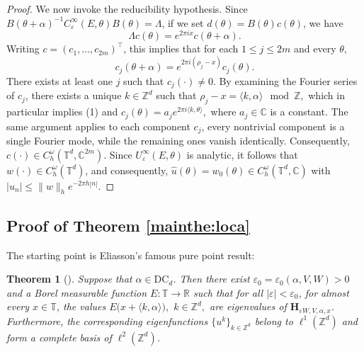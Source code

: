 \documentclass[reqno,11pt]{amsart}
\newtheorem{theorem}{Theorem}[section]
\begin{document}
\begin{proof}
We now invoke the reducibility hypothesis.
Since
$B(\theta+\alpha)^{-1}C_{\varepsilon}^{\infty}(E,\theta)B(\theta)=\Lambda$, if we  set $d(\theta) = B(\theta) c(\theta)$, we have
$$\Lambda  c(\theta)=e^{2\pi i x}  c(\theta+\alpha).$$
Writing $c=(c_1,\dots,c_{2m})^\top$, this implies that for each
$1\le j\le 2m$ and every $\theta$,
$$c_j(\theta+\alpha)=e^{2\pi i(\rho_j-x)}  c_j(\theta).
$$
 There exists at least one $j$ such that $c_j(\cdot)\neq0$.  By examining the Fourier series of $c_j$, there exists a unique $k \in \mathbb{Z}^d$ such that $
\rho_j - x = \langle k, \alpha \rangle \mod \mathbb{Z},
$ which in particular implies (1) and $
c_j(\theta) = a_j e^{2\pi i \langle k, \theta \rangle},
$ where $a_j \in \mathbb{C}$ is a constant. 
The same argument applies to each component $c_j$,
every nontrivial component is a single Fourier mode, while the remaining ones
vanish identically.
Consequently, $c(\cdot) \in C_h^\omega(\mathbb{T}^d, \mathbb{C}^{2m})$. Since $U_\varepsilon^{\infty}(E,\theta)$ is analytic, it follows that $w(\cdot) \in C_h^\omega(\mathbb{T}^d)$, and consequently, $\widehat{u}(\theta) =w_0(\theta)  \in C_h^\omega(\mathbb{T}^d, \mathbb{C})$ with $
|u_n| \leq \|w\|_h e^{-2\pi h |n |}.
$
\end{proof}












\subsection*{Proof of Theorem \ref{mainthe:loca}}
The starting point is Eliasson’s famous pure point result:
  \begin{theorem}[\cite{E}]\label{cor-Eliasson}
    Suppose that $\alpha\in \mathrm{DC}_d$.  
Then there exist $\varepsilon_0=\varepsilon_0(\alpha,V,W)>0$  and a Borel measurable function  $E\colon\mathbb{T}\to\mathbb{R}$
such that for all $|\varepsilon|<\varepsilon_0$, for almost every $x\in\mathbb{T}$, the values $
E\bigl(x+\langle k,\alpha\rangle\bigr),$ $k\in\mathbb{Z}^d,$
are eigenvalues of $\mathbf H_{\varepsilon W,V,\alpha,x}$. Furthermore, the corresponding eigenfunctions
$\{u^k\}_{k\in\mathbb{Z}^d}$ belong to $\ell^1(\mathbb{Z}^d)$ and form a complete basis of
$\ell^2(\mathbb{Z}^d)$.
\end{theorem}
\end{document}
